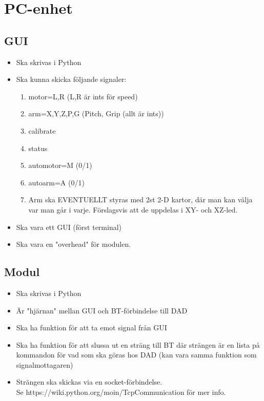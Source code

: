 %
\section{PC-enhet}
	\subsection{GUI}
	\begin{itemize}
		\item Ska skrivas i Python
		\item Ska kunna skicka följande signaler:
		\begin{enumerate}
			\item motor=L,R (L,R är ints för speed)
			\item arm=X,Y,Z,P,G (Pitch, Grip (allt är ints))
			\item calibrate
			\item status
			\item automotor=M (0/1)
			\item autoarm=A (0/1)
			\item Arm ska EVENTUELLT styras med 2st 2-D kartor, där man kan välja var man går i varje. Förslagsvis att de uppdelas i XY- och XZ-led.
		\end{enumerate}
		\item Ska vara ett GUI (först terminal)
		\item Ska vara en "overhead" för modulen.
		
	\end{itemize}
	\pagebreak
	
	\subsection{Modul}
	\begin{itemize}
		\item Ska skrivas i Python
		\item Är "hjärnan" mellan GUI och BT-förbindelse till DAD
		\item Ska ha funktion för att ta emot signal från GUI
		\item Ska ha funktion för att slussa ut en sträng till BT där strängen är en lista på kommandon för vad som ska göras hos DAD (kan vara samma funktion som signalmottagaren)
		\item Strängen ska skickas via en socket-förbindelse. \\
		Se https://wiki.python.org/moin/TcpCommunication för mer info.
	\end{itemize}
	\pagebreak

